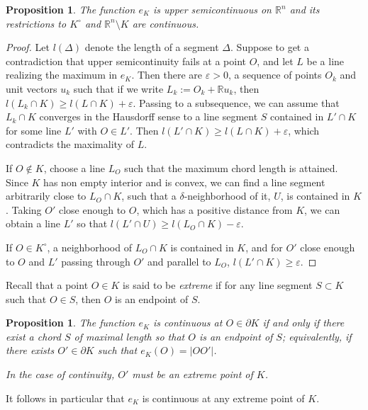 \documentclass[a4paper,12pt]{amsart}
\newtheorem{prop}[thm]{Proposition}
\def\R{\mathbb R}
\def\eps{\varepsilon}
\begin{document}
\begin{prop}
The function $e_K$ is  upper semicontinuous  on $\R^n$ and its
restrictions to $K^\circ$ and $\R^n\setminus K$ are continuous.
\end{prop}

\begin{proof}
Let $l(\Delta)$ denote the length of a segment $\Delta.$ Suppose
to get a contradiction that upper semicontinuity fails at a point
$O$, and let $L$ be a line realizing the maximum in $e_K$. Then
there are $\eps>0$, a sequence of points $O_k$ and unit vectors
$u_k$ such that if we write $L_k:= O_k + \R u_k$, then $l(L_k \cap
K) \ge l(L \cap K)+\eps$.  Passing to a subsequence, we can assume
that $L_k \cap K$ converges in the Hausdorff sense to a line
segment $S$ contained in $L'\cap K$ for some line $L'$ with $O\in
L'$. Then $l(L' \cap K) \ge l(L \cap K)+\eps$, which contradicts
the maximality of $L$.

If $O\notin K$, choose a line $L_O$ such that the maximum chord
length is attained.  Since $K$ has non empty interior and is
convex, we can find a line segment arbitrarily close to $L_O\cap
K$, such that a $\delta$-neighborhood of it, $U$, is contained in
$K$. Taking $O'$ close enough to $O$, which has a positive
distance from $K$, we can obtain a line $L'$ so that $l(L'\cap
U)\ge l(L_O\cap K)-\eps$.

If $O\in K^\circ$, a neighborhood of $L_O\cap K$ is contained in
$K$, and for $O'$ close enough to $O$ and $L'$ passing through
$O'$ and parallel to $L_O$, $l(L'\cap K)\ge \eps$.
\end{proof}

Recall that a point $O\in K$ is said to be \emph{extreme} if for
any line segment $S\subset K$ such that $O\in S$, then $O$ is an
endpoint of $S$.

\begin{prop} The function $e_K$ is continuous
at $O\in\partial K$ if and only if there exist a chord $S$ of maximal length so that
$O$ is an endpoint of $S$; equivalently, if there exists $O'\in \partial K$ such that
$e_K(O)=|OO'|$.

In the case of continuity, $O'$ must be an extreme point of $K$.
\end{prop}

It follows in particular that $e_K$ is continuous at any extreme point of $K$.
\end{document}
